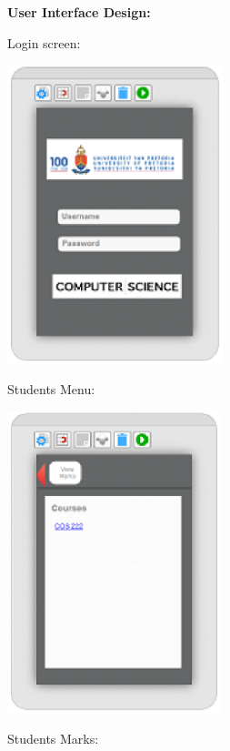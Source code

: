 \documentclass{article}
\begin{document}
\textbf{User Interface Design:}

Login screen: 

\includegraphics*[width=2.47in, height=3.42in, keepaspectratio=false]{image23}







Students Menu:

 \includegraphics*[width=2.45in, height=3.46in, keepaspectratio=false]{image24}













Students Marks: 
\end{document}
